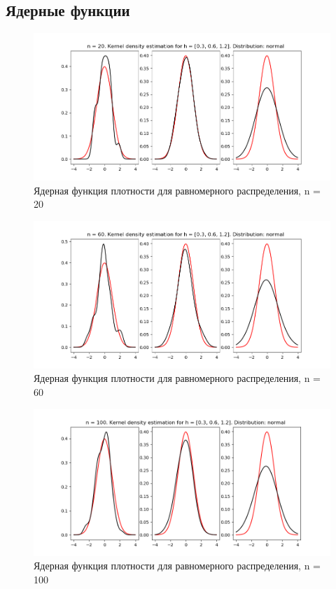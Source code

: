 \documentclass[a4]{article}
\begin{document}
\subsection{Ядерные функции}

\begin{center}
    \begin{figure}[H]
 \caption{Ядерная функция плотности для равномерного распределения, n = 20}
\includegraphics[width=\textwidth]{d_normal20.png}
\end{figure}
    \begin{figure}[H]
 \caption{Ядерная функция плотности для равномерного распределения, n = 60}
\includegraphics[width=\textwidth]{d_normal60.png}
\end{figure}
    \begin{figure}[H]
 \caption{Ядерная функция плотности для равномерного распределения, n = 100}
\includegraphics[width=\textwidth]{d_normal100.png}
\end{figure}


\end{center}
\end{document}

